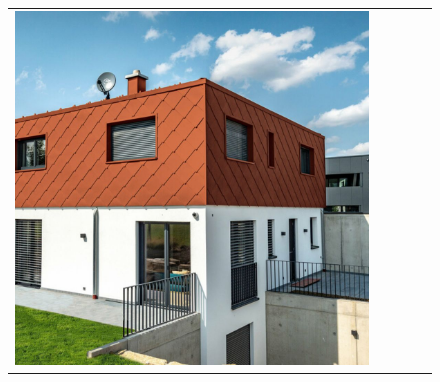 \begin{figure}[H]
{\begin{tabular}{@{}ccccc@{}}
      \includegraphics[width=\linewidth]{Images/LoRAs/Geleding/Training_images/10.jpg} \\[2pt]


\end{tabular}}
\end{figure}
